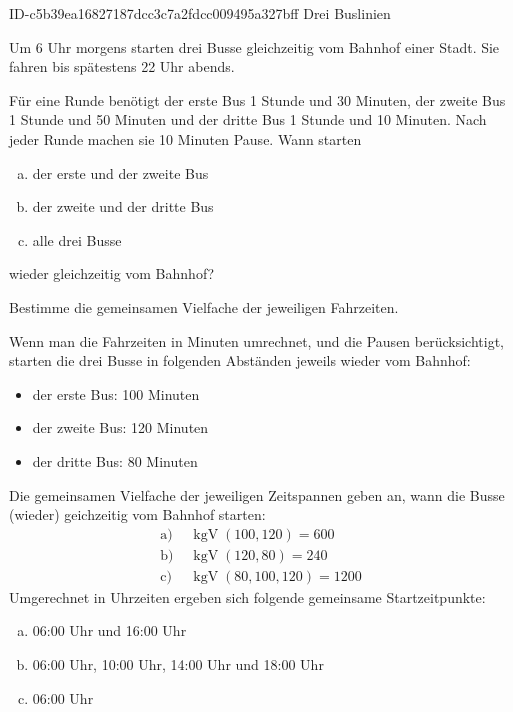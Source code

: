 \begin{exercise}
      {ID-c5b39ea16827187dcc3c7a2fdcc009495a327bff}
      {Drei Buslinien}
  \ifproblem\problem\par
    Um 6 Uhr morgens starten drei Busse gleichzeitig vom Bahnhof einer Stadt.
    Sie fahren bis spätestens 22 Uhr abends.\par
    Für eine Runde benötigt
    der  erste   Bus 1 Stunde und 30 Minuten,
    der  zweite  Bus 1 Stunde und 50 Minuten und
    der  dritte  Bus 1 Stunde und 10 Minuten.
    Nach jeder Runde machen sie 10 Minuten Pause.
    Wann starten
    \begin{enumerate}[a)]
      \squeeze
      \item der erste und der zweite Bus
      \item der zweite und der dritte Bus
      \item alle drei Busse
    \end{enumerate}
    wieder gleichzeitig vom Bahnhof?
  \fi
  \ifoutline\outline\par
    Bestimme die gemeinsamen Vielfache der jeweiligen Fahrzeiten.
  \fi
  \ifoutcome\outcome\par
    Wenn man die Fahrzeiten in Minuten umrechnet, und die Pausen berücksichtigt,
    starten die drei Busse in folgenden Abständen jeweils wieder vom Bahnhof:
    \begin{itemize}
      \squeeze
      \item der erste Bus: 100 Minuten
      \item der zweite Bus: 120 Minuten
      \item der dritte Bus: 80 Minuten
    \end{itemize}
    Die gemeinsamen Vielfache der jeweiligen Zeitspannen geben an,
    wann die Busse (wieder) geichzeitig vom Bahnhof starten:
    \begin{equation*}
      \begin{split}
        \text{a) }&\operatorname{kgV}(100, 120)=600\\
        \text{b) }&\operatorname{kgV}(120, 80)=240\\
        \text{c) }&\operatorname{kgV}(80, 100, 120)=1200
      \end{split}
    \end{equation*}
    Umgerechnet in Uhrzeiten ergeben sich folgende gemeinsame Startzeitpunkte:
    \begin{enumerate}[a)]
      \item {} 06:00 Uhr und 16:00 Uhr
      \item {} 06:00 Uhr, 10:00 Uhr, 14:00 Uhr und 18:00 Uhr
      \item {} 06:00 Uhr
    \end{enumerate}
  \fi
\end{exercise}
